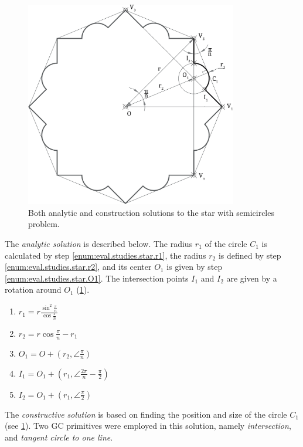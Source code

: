 \begin{figure}[htb]
  \centering
  \includegraphics[height=9cm]{fig/star-solution}
  \caption[Star with semicircles problem solution]{Both analytic and
    construction solutions to the star with semicircles problem.}%
  \label{fig:eval.studies.star.sol}
\end{figure}

The \textit{analytic solution} is described below.  The radius $r_1$ of the
circle $C_1$ is calculated by step \ref{enum:eval.studies.star.r1}, the radius
$r_2$ is defined by step \ref{enum:eval.studies.star.r2}, and its center $O_1$
is given by step \ref{enum:eval.studies.star.O1}.  The intersection points $I_1$
and $I_2$ are given by a rotation around $O_1$
(\cref{fig:eval.studies.star.sol}).

\begin{enumerate}
  \item $r_1 = r\frac{\sin^2\frac{\pi}{n}}{\cos\frac{\pi}{n}}$%
  \label{enum:eval.studies.star.r1}
  \item $r_2 = r\cos\frac{\pi}{n} - r_1$%
  \label{enum:eval.studies.star.r2}
  \item $O_1 = O + \left(r_2, \angle\frac{\pi}{n}\right)$%
  \label{enum:eval.studies.star.O1}
  \item $I_1 = O_1 + \left(r_1, \angle\frac{2\pi}{n} - \frac{\pi}{2}\right)$
  \item $I_2 = O_1 + \left(r_1, \angle\frac{\pi}{2}\right)$
\end{enumerate}

The \textit{constructive solution} is based on finding the position and size of
the circle $C_1$ (see \cref{fig:eval.studies.star.sol}).  Two \ac{GC}
primitives were employed in this solution, namely \textit{intersection}, and
\textit{tangent circle to one line}.

